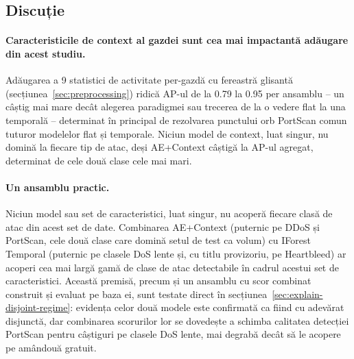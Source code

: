 \subsection{Discuție}

\paragraph{Caracteristicile de context al gazdei sunt cea mai impactantă adăugare din acest studiu.} Adăugarea a 9 statistici de activitate per-gazdă cu fereastră glisantă (secțiunea~\ref{sec:preprocessing}) ridică AP-ul de la 0.79 la 0.95 per ansamblu -- un câștig mai mare decât alegerea paradigmei sau trecerea de la o vedere flat la una temporală -- determinat în principal de rezolvarea punctului orb PortScan comun tuturor modelelor flat și temporale. Niciun model de context, luat singur, nu domină la fiecare tip de atac, deși AE+Context câștigă la AP-ul agregat, determinat de cele două clase cele mai mari.

\paragraph{Un ansamblu practic.} Niciun model sau set de caracteristici, luat singur, nu acoperă fiecare clasă de atac din acest set de date. Combinarea AE+Context (puternic pe DDoS și PortScan, cele două clase care domină setul de test ca volum) cu IForest Temporal (puternic pe clasele DoS lente și, cu titlu provizoriu, pe Heartbleed) ar acoperi cea mai largă gamă de clase de atac detectabile în cadrul acestui set de caracteristici. Această premisă, precum și un ansamblu cu scor combinat construit și evaluat pe baza ei, sunt testate direct în secțiunea~\ref{sec:explain-disjoint-regime}: evidența celor două modele este confirmată ca fiind cu adevărat disjunctă, dar combinarea scorurilor lor se dovedește a schimba calitatea detecției PortScan pentru câștiguri pe clasele DoS lente, mai degrabă decât să le acopere pe amândouă gratuit.